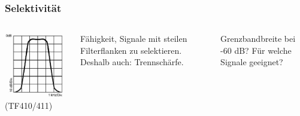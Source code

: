 \begin{frame}
  \frametitle{Selektivität}

  \begin{columns}
    \begin{center}
      \includegraphics[width=\textwidth,height=.8\textheight,keepaspectratio]{a18/TF410.png}\\
      {\tiny (TF410/411)}
    \end{center}


    Fähigkeit, Signale mit steilen Filterflanken zu selektieren. Deshalb auch:
    Trennschärfe.

    \begin{exampleblock}{Grenzbandbreite bei -60 dB? Für welche Signale geeignet?}
    \end{exampleblock}

  \end{columns}

\end{frame}

